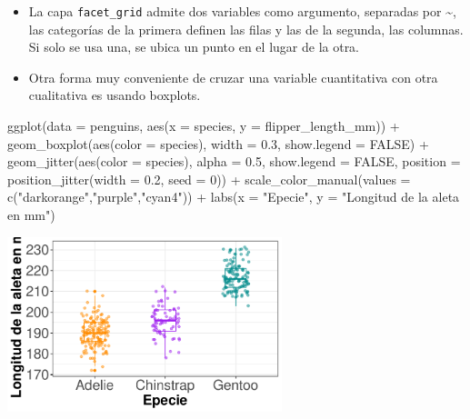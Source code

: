 \documentclass[
  letterpaper,
  DIV=11,
  numbers=noendperiod]{scrreprt}
\newenvironment{Shaded}{\begin{snugshade}}{\end{snugshade}}
\newcommand{\AttributeTok}[1]{\textcolor[rgb]{0.40,0.45,0.13}{#1}}
\newcommand{\ConstantTok}[1]{\textcolor[rgb]{0.56,0.35,0.01}{#1}}
\newcommand{\DecValTok}[1]{\textcolor[rgb]{0.68,0.00,0.00}{#1}}
\newcommand{\FloatTok}[1]{\textcolor[rgb]{0.68,0.00,0.00}{#1}}
\newcommand{\FunctionTok}[1]{\textcolor[rgb]{0.28,0.35,0.67}{#1}}
\newcommand{\NormalTok}[1]{\textcolor[rgb]{0.00,0.23,0.31}{#1}}
\newcommand{\SpecialCharTok}[1]{\textcolor[rgb]{0.37,0.37,0.37}{#1}}
\newcommand{\StringTok}[1]{\textcolor[rgb]{0.13,0.47,0.30}{#1}}
\begin{document}
\begin{itemize}
\item
  La capa \texttt{facet\_grid} admite dos variables como argumento,
  separadas por \textasciitilde, las categorías de la primera definen
  las filas y las de la segunda, las columnas. Si solo se usa una, se
  ubica un punto en el lugar de la otra.
\item
  Otra forma muy conveniente de cruzar una variable cuantitativa con
  otra cualitativa es usando boxplots.
\end{itemize}

\begin{Shaded}
\begin{Highlighting}[]
\FunctionTok{ggplot}\NormalTok{(}\AttributeTok{data =}\NormalTok{ penguins, }\FunctionTok{aes}\NormalTok{(}\AttributeTok{x =}\NormalTok{ species, }\AttributeTok{y =}\NormalTok{ flipper\_length\_mm)) }\SpecialCharTok{+}
  \FunctionTok{geom\_boxplot}\NormalTok{(}\FunctionTok{aes}\NormalTok{(}\AttributeTok{color =}\NormalTok{ species), }\AttributeTok{width =} \FloatTok{0.3}\NormalTok{, }
               \AttributeTok{show.legend =} \ConstantTok{FALSE}\NormalTok{) }\SpecialCharTok{+} 
  \FunctionTok{geom\_jitter}\NormalTok{(}\FunctionTok{aes}\NormalTok{(}\AttributeTok{color =}\NormalTok{ species), }\AttributeTok{alpha =} \FloatTok{0.5}\NormalTok{, }
              \AttributeTok{show.legend =} \ConstantTok{FALSE}\NormalTok{, }
              \AttributeTok{position =} \FunctionTok{position\_jitter}\NormalTok{(}\AttributeTok{width =} \FloatTok{0.2}\NormalTok{, }\AttributeTok{seed =} \DecValTok{0}\NormalTok{)) }\SpecialCharTok{+}
  \FunctionTok{scale\_color\_manual}\NormalTok{(}\AttributeTok{values =} \FunctionTok{c}\NormalTok{(}\StringTok{"darkorange"}\NormalTok{,}\StringTok{"purple"}\NormalTok{,}\StringTok{"cyan4"}\NormalTok{)) }\SpecialCharTok{+}
  \FunctionTok{labs}\NormalTok{(}\AttributeTok{x =} \StringTok{"Epecie"}\NormalTok{, }\AttributeTok{y =} \StringTok{"Longitud de la aleta en mm"}\NormalTok{)}
\end{Highlighting}
\end{Shaded}

\begin{center}
\includegraphics[width=0.6\textwidth,height=0.5\textheight]{t1_intro_files/figure-pdf/unnamed-chunk-101-1.pdf}
\end{center}
\end{document}
